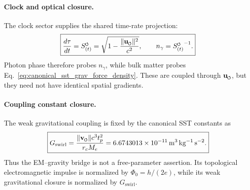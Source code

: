 \documentclass[11pt]{article}
\theoremstyle{definition}
\theoremstyle{plain}
\theoremstyle{remark}
\newcommand{\swirlarrow}{\mathchoice{\mkern-2mu\scriptstyle\boldsymbol{\circlearrowleft}}{\mkern-2mu\scriptstyle\boldsymbol{\circlearrowleft}}{\mkern-2mu\scriptscriptstyle\boldsymbol{\circlearrowleft}}{\mkern-2mu\scriptscriptstyle\boldsymbol{\circlearrowleft}}}
\newcommand{\vswirl}{\mathbf{v}_{\swirlarrow}}
\newcommand{\SwirlClock}{{S_{(t)}^{\swirlarrow}}}
\newcommand{\rc}{{r_c}}
\begin{document}
        \paragraph{Clock and optical closure.}
        The clock sector supplies the shared time-rate projection:
        \begin{align}
            \boxed{
            \frac{d\tau}{dt}
            =
            \SwirlClock
            =
            \sqrt{1-\frac{\lVert\mathbf{u}_{\swirlarrow}\rVert^2}{c^2}},
            \qquad
            n_\gamma=\SwirlClock^{-1}.
            }
            \label{eq:canonical_emg_clock_optical_closure}
        \end{align}
        Photon phase therefore probes \(n_\gamma\), while bulk matter probes Eq.~\eqref{eq:canonical_sst_grav_force_density}. These are coupled through \(\mathbf{u}_{\swirlarrow}\), but they need not have identical spatial gradients.

        \paragraph{Coupling constant closure.}
        The weak gravitational coupling is fixed by the canonical SST constants as
        \begin{align}
            \boxed{
            G_{\mathrm{swirl}}
            =
            \frac{\lVert\vswirl\rVert c^3 t_p^2}{\rc M_e}
            =
            6.6743013\times10^{-11}\,\mathrm{m^3\,kg^{-1}\,s^{-2}}.
            }
            \label{eq:canonical_gswirl_emg_closure}
        \end{align}
        Thus the EM--gravity bridge is not a free-parameter assertion. Its topological electromagnetic impulse is normalized by \(\Phi_0=h/(2e)\), while its weak gravitational closure is normalized by \(G_{\mathrm{swirl}}\).
\end{document}
